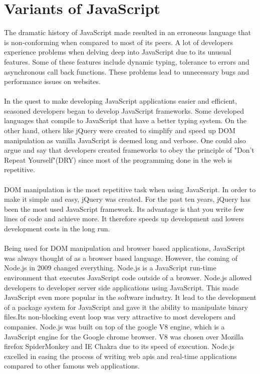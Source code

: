 \section{Variants of JavaScript}
The dramatic history of JavaScript made resulted in an erroneous language that is non-conforming when compared to most of its peers. A lot of developers experience problems when delving deep into JavaScript due to its unusual features. Some of these features include dynamic typing, tolerance to errors and asynchronous call back functions. These problems lead to unnecessary bugs and performance issues on websites.
\paragraph{}
In the quest to make developing JavaScript applications easier and efficient, seasoned developers began to develop JavaScript frameworks. Some developed languages that compile to JavaScript that have a better typing system. On the other hand, others like jQuery were created to simplify and speed up DOM manipulation as vanilla JavaScript is deemed long and verbose. One could also argue and say that developers created frameworks to obey the principle of "Don't Repeat Yourself"(DRY) since most of the programming done in the web is repetitive. 
\paragraph{}
DOM manipulation is the most repetitive task when using JavaScript. In order to make it simple and easy, jQuery was created. For the past ten years, jQuery has been the most used JavaScript framework. Its advantage is that you write few lines of code and achieve more. It therefore speeds up development and lowers development costs in the long run.
\paragraph{}
Being used for DOM manipulation and browser based applications, JavaScript was always thought of as a browser based language. However, the coming of Node.js in 2009 changed everything. Node.js is a JavaScript run-time environment that executes JavaScript code outside of a browser. Node.js allowed developers to developer server side applications using JavaScript. This made JavaScript even more popular in the software industry. It lead to the development of a package system for JavaScript and gave it the ability to manipulate binary files.Its non-blocking event loop was very attractive to most developers and companies. Node.js was built on top of the google V8 engine, which is a JavaScript engine for the Google chrome browser. V8 was chosen over Mozilla firefox SpiderMonkey and IE Chakra due to its speed of execution. Node.js excelled in easing the process of writing web apis and real-time applications compared to other famous web applications.
